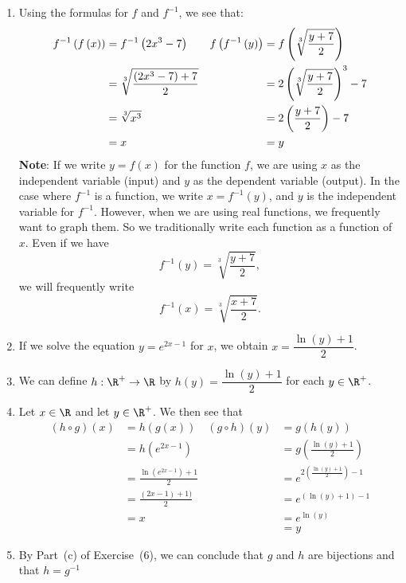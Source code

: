 \documentclass[11pt]{article}
\begin{document}
\begin{enumerate}
\item Using the formulas for $f$ and $f^{-1}$, we see that:
\begin{align}
f^{ - 1} \left( {f\left( x \right)} \right) &= f^{ - 1} \left( {2x^3  - 7} \right)  & 
f\left( {f^{ - 1} \left( y \right)} \right) &= f\left( {\sqrt[3]{{\frac{{y + 7}}
{2}}}} \right) \notag\\
   &= \sqrt[3]{{\frac{{\left( {2x^3  - 7} \right) + 7}}{2}}} &
   &= 2\left( {\sqrt[3]{{\frac{{y + 7}}{2}}}} \right)^3  - 7 \notag \\
   &= \sqrt[3]{{x^3 }}  &     &= 2\left( {\frac{{y + 7}}{2}} \right) - 7 \notag \\
   &= x                 &     &= y \notag
\end{align}
\noindent
\textbf{Note}:  If we write  $y = f( x )$ for the function  $f$, we are using  $x$  as the independent variable (input) and  $y$  as the dependent variable (output).  In the case where  $f^{ - 1} $ is a function, we write  $x = f^{ - 1} ( y )$, and  $y$  is the independent variable for  $f^{ - 1} $.  However, when we are using real functions, we frequently want to graph them.  So we traditionally write each function as a function of  $x$.  Even if we have 
\[
f^{ - 1} ( y ) = \sqrt[3]{{\frac{{y + 7}}{2}}}, 
\]
we will frequently write 
\[
f^{ - 1} ( x ) = \sqrt[3]{{\frac{{x + 7}}{2}}}.
\]


\item If we solve the equation $y = e^{2x - 1}$ for $x$, we obtain $x = \dfrac{\ln(y) + 1}{2}$.

\item We can define $h: \R^+ \to \R$ by $h(y) = \dfrac{\ln(y) + 1}{2}$ for each $y \in \R^+$.

\item Let $x \in \R$ and let $y \in \R^+$.  We then see that
\begin{align*}
(h \circ g)(x) &= h \left( g(x) \right)  &  (g \circ h)(y) &= g \left( h(y) \right) \\
               &= h \left( e^{2x - 1} \right) &  &= g \left( \frac{\ln(y) + 1}{2} \right) \\
               &= \frac{\ln \left( e^{2x - 1} \right) + 1}{2} & &= e^{2 \left( \frac{\ln(y) + 1}{2} \right) - 1} \\
               &= \frac{(2x - 1) + 1)}{2} & &= e^{\left( \ln(y) + 1 \right) - 1} \\
               &= x   &  &= e^{\ln(y)} \\
               &      &  &= y
\end{align*}


\item By Part~(c) of Exercise~(6), we can conclude that $g$ and $h$ are bijections and that $h = g^{-1}$
\end{enumerate}
\end{document}
